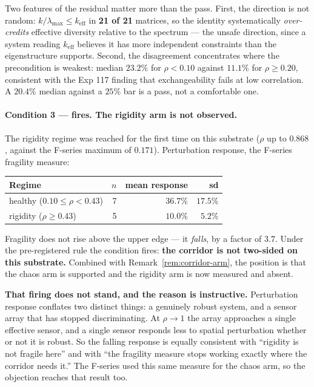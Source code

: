 \documentclass[11pt,a4paper]{article}
\theoremstyle{definition}
\theoremstyle{remark}
\newcommand{\keff}{k_{\text{eff}}}
\begin{document}
Two features of the residual matter more than the pass. First, the direction is not random:
$k/\lambda_{\max} \leq \keff$ in \textbf{21 of 21} matrices, so the identity systematically
\emph{over-credits} effective diversity relative to the spectrum --- the unsafe direction, since
a system reading $\keff$ believes it has more independent constraints than the eigenstructure
supports. Second, the disagreement concentrates where the precondition is weakest: median
$23.2\%$ for $\rho < 0.10$ against $11.1\%$ for $\rho \geq 0.20$, consistent with the Exp 117
finding that exchangeability fails at low correlation. A $20.4\%$ median against a $25\%$ bar is
a pass, not a comfortable one.

\paragraph{Condition 3 --- fires. The rigidity arm is not observed.}
The rigidity regime was reached for the first time on this substrate ($\rho$ up to $0.868$,
against the F-series maximum of $0.171$). Perturbation response, the F-series fragility measure:

\begin{center}
\begin{tabular}{lrrr}
\toprule
Regime & $n$ & mean response & sd \\
\midrule
healthy ($0.10 \leq \rho < 0.43$) & 7 & $36.7\%$ & $17.5\%$ \\
rigidity ($\rho \geq 0.43$) & 5 & $\mathbf{10.0\%}$ & $5.2\%$ \\
\bottomrule
\end{tabular}
\end{center}

Fragility does not rise above the upper edge --- it \emph{falls}, by a factor of $3.7$. Under
the pre-registered rule the condition fires: \textbf{the corridor is not two-sided on this
substrate.} Combined with Remark~\ref{rem:corridor-arm}, the position is that the chaos arm is
supported and the rigidity arm is now measured and absent.

\textbf{That firing does not stand, and the reason is instructive.} Perturbation response
conflates two distinct things: a genuinely robust system, and a sensor array that has stopped
discriminating. At $\rho \to 1$ the array approaches a single effective sensor, and a single
sensor responds less to spatial perturbation whether or not it is robust. So the falling
response is equally consistent with ``rigidity is not fragile here'' and with ``the fragility
measure stops working exactly where the corridor needs it.'' The F-series used this same measure
for the chaos arm, so the objection reaches that result too.
\end{document}

